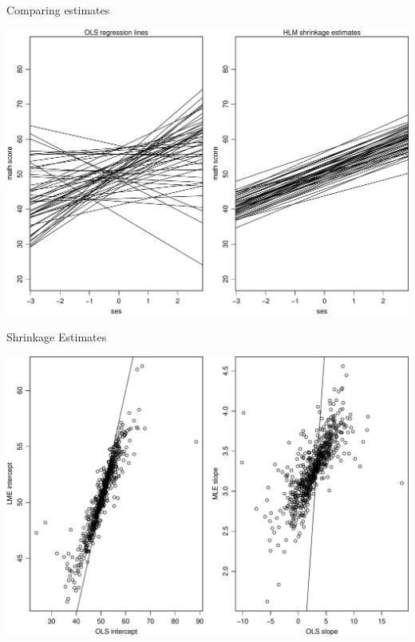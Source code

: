 \documentclass[ignorenonframetext,]{beamer}
\begin{document}
\begin{frame}{Comparing estimates}

\includegraphics{ancova_01_deck_files/figure-beamer/compest-1.pdf}

\end{frame}

\begin{frame}{Shrinkage Estimates}

\includegraphics{ancova_01_deck_files/figure-beamer/shrinkydinky-1.pdf}

\end{frame}
\end{document}
